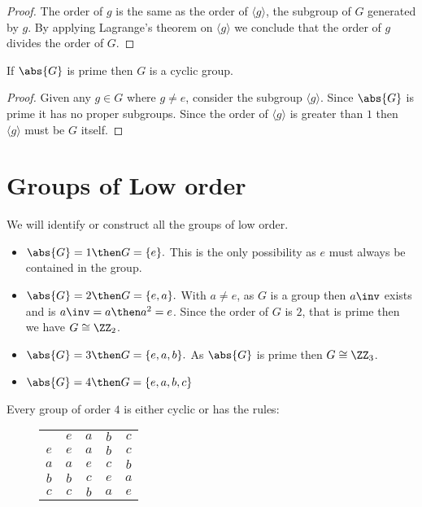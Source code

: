 \documentclass[12pt, a4paper]{article}
\begin{document}
\begin{proof}
    The order of \(g\) is the same as the order of \(\langle g \rangle\), the subgroup of \(G\) generated by \(g\). By applying Lagrange's theorem on \(\langle g \rangle\) we conclude that the order of \(g\) divides the order of \(G\).
\end{proof}

\begin{corollary}
    If \(\abs{G}\) is prime then \(G\) is a cyclic group.
\end{corollary}

\begin{proof}
    Given any \(g \in G\) where \(g \neq e\), consider the subgroup \(\langle g \rangle\). Since \(\abs{G}\) is prime it has no proper subgroups. Since the order of \(\langle g \rangle\) is greater than \(1\) then \(\langle g \rangle\) must be \(G\) itself.
\end{proof}


\pagebreak

\section{Groups of Low order}

We will identify or construct all the groups of low order.

\begin{itemize}
    \item \(\abs{G} =1 \then G=\{e\}.\) This is the only possibility as \(e\) must always be contained in the group.
    \item \(\abs{G}=2 \then G=\{e,a\}.\) With \(a\neq e\), as \(G\) is a group then \(a\inv\) exists and is \(a\inv =a \then a^2=e\). Since the order of \(G\) is \(2\), that is prime then we have \(G\cong \ZZ_2\).
    \item \(\abs{G}=3 \then G=\{e,a,b\}.\) As \(\abs{G}\) is prime then \(G\cong \ZZ_3\). 
    \item \(\abs{G}=4 \then G=\{e,a,b,c\}\)
\end{itemize}

\begin{theorem}
    Every group of order \(4\) is either cyclic or has the rules:
    \begin{figure}[H]
        \begin{center}
            \noindent\begin{tabular}{c | c c c c }
                & $e$ & $a$ & $b$ & $c$   \\
                \cline{1-5}
               $e$ & $e$ & $a$ & $b$ & $c$  \\
               $a$ & $a$ & $e$ & $c$ & $b$  \\
               $b$ & $b$ & $c$ & $e$ & $a$  \\
               $c$ & $c$ & $b$ & $a$ & $e$ \\
            \end{tabular}
        \end{center}
    \end{figure}
\end{theorem}
\end{document}
